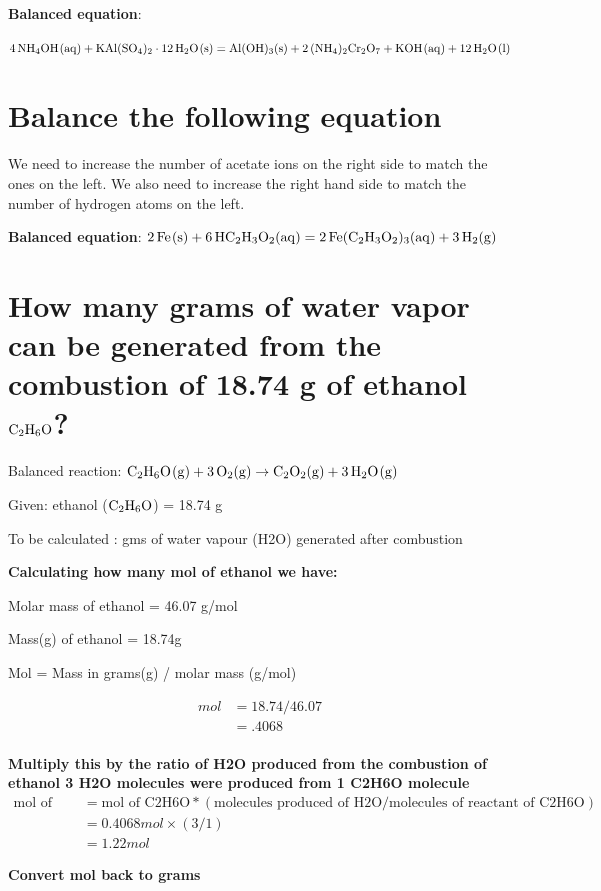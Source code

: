 \documentclass{scrartcl}
\begin{document}
\textbf{Balanced equation}:

\(\ce{4NH4OH(aq) + KAl(SO4)2} \cdot \ce{12H2O(s)} = \ce{Al(OH)3(s)} +
\ce{2(NH4)2Cr2O7 + KOH(aq)} + \ce{12H2O(l)}\)

\section{Balance the following equation}
\label{sec:org272fc2c}
We need to increase the number of acetate ions on the right side to match the
ones on the left. We also need to increase the right hand side to match the
number of hydrogen atoms on the left.

\textbf{Balanced equation}:
\(\ce{2Fe(s)}+\ce{6HC2H3O2(aq)}=\ce{2Fe(C2H3O2)3(aq)}+\ce{3H2(g)}\)

\section{How many grams of water vapor can be generated from the combustion of 18.74 g of ethanol \(\ce{C2H6O}\)?}
\label{sec:orgb325ef7}
Balanced reaction:
\(\ce{C2H6O(g) + 3O2(g)} \rightarrow \ce{C2O2(g) + 3H2O(g)}\)

Given: ethanol (\(\ce{C2H6O}\)) =  18.74 g

To be calculated : gms of water vapour (H2O) generated after combustion

\textbf{Calculating how many mol of ethanol we have:}

Molar mass of ethanol = 46.07 g/mol

Mass(g) of ethanol = 18.74g

Mol = Mass in grams(g) / molar mass (g/mol)

\begin{align*}
mol&=18.74/46.07\\
&=.4068\\
\end{align*}

\textbf{Multiply this by the ratio of H2O produced from the combustion of ethanol 3 H2O molecules were produced from 1 C2H6O molecule}
\begin{align*}
\text{mol of H2O}&=\text{mol of C2H6O} * (\text{molecules produced of H2O}/\text{molecules of reactant of C2H6O})\\
&=0.4068mol \times (3/1)\\
&=1.22mol
\end{align*}

\textbf{Convert mol back to grams}
\end{document}
